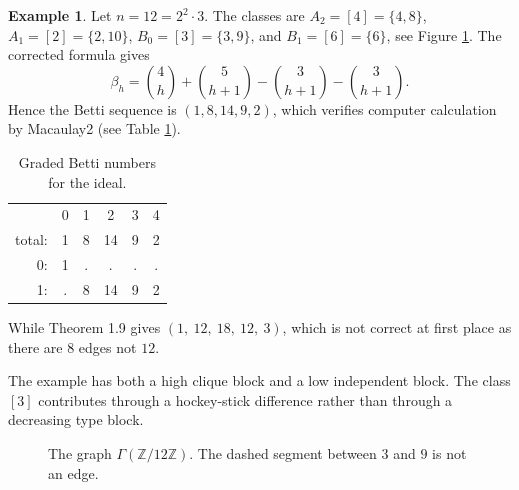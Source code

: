 \documentclass[12pt]{article}
\theoremstyle{definition}
\newtheorem{example}[theorem]{Example}
\begin{document}
\begin{example}\label{ex:z12}
Let $n=12=2^2\cdot 3$.  The classes are $A_2=[4]=\{4,8\}$, $A_1=[2]=\{2,10\}$, $B_0=[3]=\{3,9\}$, and $B_1=[6]=\{6\}$, see Figure \ref{fig:z12}.  The corrected formula gives
$$
\beta_h=\binom{4}{h}+\binom{5}{h+1}-\binom{3}{h+1}-\binom{3}{h+1}.
$$
Hence the Betti sequence is $(1, 8,14,9,2)$, which verifies computer calculation by Macaulay2 \cite{Macaulay2} (see Table \ref{tab:betti_numbers}).
\end{example}
\begin{table}[H]
	\centering
	\ttfamily %
	\begin{tabular}{r c c c c c}
		& 0 & 1 & 2  & 3 & 4 \\
		total: & 1 & 8 & 14 & 9 & 2 \\
		0: & 1 & . & .  & . & . \\
		1: & . & 8 & 14 & 9 & 2 \\
	\end{tabular}
	\normalfont %
	\caption{Graded Betti numbers for the ideal.}
	\label{tab:betti_numbers}
\end{table}
While Theorem 1.9 \cite{DungVu2026} gives $(1,\ 12,\ 18,\ 12,\ 3)$, which is not correct at first place as there are $8$ edges not $12$.
\medskip

The example has both a high clique block and a low independent block.  The class $[3]$ contributes through a hockey-stick difference rather than through a decreasing type block.

\medskip

\begin{figure}[H]
\centering
{}
\caption{The graph $\Gamma(\mathbb{Z}/12\mathbb{Z})$.  The dashed segment between $3$ and $9$ is not an edge.}
\label{fig:z12}
\end{figure}

\medskip
\end{document}
